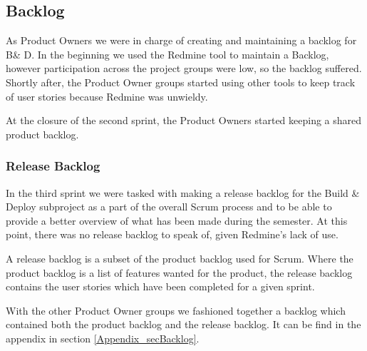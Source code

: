 \subsection{Backlog} \label{Roles_SecReleaseBacklog}
As Product Owners we were in charge of creating and maintaining a backlog for B\& D. In the beginning we used the Redmine tool to maintain a Backlog, however participation across the project groups were low, so the backlog suffered. Shortly after, the Product Owner groups started using other tools to keep track of user stories because Redmine was unwieldy.

At the closure of the second sprint, the Product Owners started keeping a shared product backlog.

\subsubsection{Release Backlog}
In the third sprint we were tasked with making a release backlog for the Build \& Deploy subproject as a part of the overall Scrum process and to be able to provide a better overview of what has been made during the semester. At this point, there was no release backlog to speak of, given Redmine's lack of use.

A release backlog is a subset of the product backlog used for Scrum. Where the product backlog is a list of features wanted for the product, the release backlog contains the user stories which have been completed for a given sprint.

With the other Product Owner groups we fashioned together a backlog which contained both the product backlog and the release backlog. It can be find in the appendix in section \ref{Appendix_secBacklog}.

